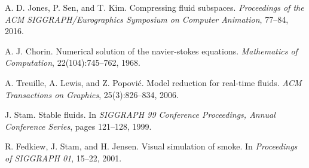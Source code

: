 \documentclass[aspectratio=169,dvipdfmx,hyperref={bookmarks=true}]{beamer}
\begin{document}
\begin{thebibliography}{99}
\beamertemplatetextbibitems
{}
A. D. Jones, P. Sen, and T. Kim. Compressing fluid subspaces. \textit{Proceedings of the ACM SIGGRAPH/Eurographics Symposium on Computer Animation}, 77--84, 2016.

A. J. Chorin. Numerical solution of the navier-stokes equations. \textit{Mathematics of Computation}, 22(104):745--762, 1968.

A. Treuille, A. Lewis, and Z. Popovi\'{c}. Model reduction for real-time fluids. \textit{ACM Transactions on Graphics}, 25(3):826--834, 2006.

J. Stam. Stable fluids. In \textit{SIGGRAPH 99 Conference Proceedings, Annual Conference Series}, pages 121--128, 1999.

R. Fedkiew, J. Stam, and H. Jensen. Visual simulation of smoke. In \textit{Proceedings of SIGGRAPH 01}, 15--22, 2001.


  

\end{thebibliography}
\end{document}
